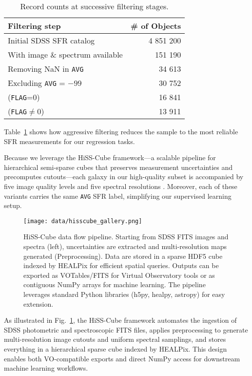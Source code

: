 \documentclass[english,bachelor,oneside]{ctufit-thesis}
\begin{document}
\begin{table}[H]
  \centering
  \caption{Record counts at successive filtering stages.}
  \label{tab:record_counts}
  \begin{tabular}{@{}lr@{}}
    \toprule
    Filtering step & \# of Objects \\
    \midrule
    Initial SDSS SFR catalog              & 4 851 200 \\
    With image \& spectrum available      & 151 190  \\
    Removing NaN in \texttt{AVG}          & 34 613   \\
    Excluding \texttt{AVG} = $-99$        & 30 752   \\
    \quad (\texttt{FLAG}=0)               & 16 841   \\
    \quad (\texttt{FLAG}$\neq$0)          & 13 911   \\
    \bottomrule
  \end{tabular}
\end{table}


Table~\ref{tab:record_counts} shows how aggressive filtering reduces the sample to the most reliable SFR measurements for our regression tasks.  

Because we leverage the HiSS-Cube framework—a scalable pipeline for hierarchical semi-sparse cubes that preserves measurement uncertainties and precomputes cutouts—each galaxy in our high-quality subset is accompanied by five image quality levels and five spectral resolutions \cite{nadvornik2021hiss}. Moreover, each of these variants carries the same \texttt{AVG} SFR label, simplifying our supervised learning setup.

\begin{figure}[H]
  \centering
  \texttt{[image: data/hisscube\_gallery.png]}
  \caption{HiSS-Cube data flow pipeline. Starting from SDSS FITS images and spectra (left), uncertainties are extracted and multi-resolution maps generated (Preprocessing). Data are stored in a sparse HDF5 cube indexed by HEALPix for efficient spatial queries. Outputs can be exported as VOTables/FITS for Virtual Observatory tools or as contiguous NumPy arrays for machine learning. The pipeline leverages standard Python libraries (h5py, healpy, astropy) for easy extension.}
  \label{fig:hisscube_pipeline}
\end{figure}

As illustrated in Fig.~\ref{fig:hisscube_pipeline}, the HiSS-Cube framework \cite{nadvornik2021hiss} automates the ingestion of SDSS photometric and spectroscopic FITS files, applies preprocessing to generate multi-resolution image cutouts and uniform spectral samplings, and stores everything in a hierarchical sparse cube indexed by HEALPix. This design enables both VO-compatible exports and direct NumPy access for downstream machine learning workflows.
\end{document}
